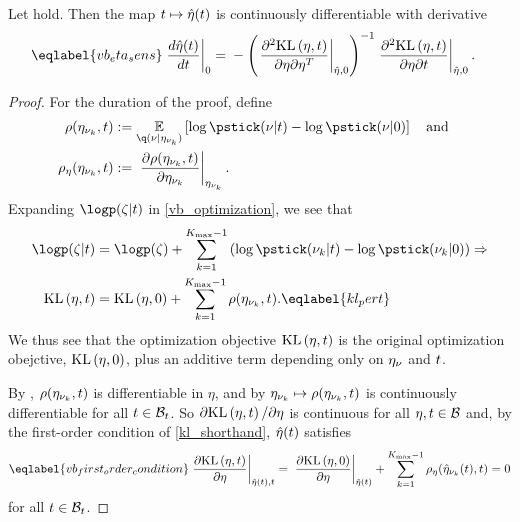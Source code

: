 \begin{thm}
%
Let  hold.  Then the map $t \mapsto
\hat\eta(t)$ is continuously differentiable with derivative
%
\begin{align}\eqlabel{vb_eta_sens}
%
\fracat{d \etaopt(\t)}{d \t}{0} ={}&
    - \left( \fracat{\partial^2 \KL{\eta, \t}}
                    {\partial \eta \partial \eta^T}
                    {\etaopt, 0} \right)^{-1}
    \fracat{\partial^2 \KL{\eta, \t}}
           {\partial \eta \partial \t}
           {\etaopt, 0}.
%
\end{align}
%
%
\begin{proof}
%
For the duration of the proof, define
%
\begin{align*}
%
\rho(\etanuk, \t) :={}&
    \expect{\q(\nu \vert \etanuk)}
           {\log \pstick(\nu \vert \t) - \log \pstick(\nu \vert 0)}
\mathand\\
\rho_\eta(\etanuk, \t) :={}&
\fracat{\partial \rho(\etanuk, \t)}
       {\partial \etanuk}{\etanuk}.
%
\end{align*}
%
Expanding $\logp(\zeta \vert \t)$ in \eqref{vb_optimization}, we see that
%
\begin{align}
%
\logp(\zeta \vert \t) ={}& \logp(\zeta) +
    \sumkm \left( \log \pstick(\nuk\vert\t) -
                  \log \pstick(\nuk \vert 0) \right) \Rightarrow \nonumber\\
\KL{\eta, \t} ={}&
    \KL{\eta, 0} + \sumkm \rho(\etanuk, \t). \eqlabel{kl_pert}
%
\end{align}
%
We thus see that the optimization objective $\mathrm{KL}\left(\eta, t\right)$ is the original
optimization obejctive, $\mathrm{KL}\left(\eta, 0\right)$, plus an additive term depending only on
$\eta_{\nu}$ and $t$.

By , $\rho(\eta_{\nu_{k}}, t)$ is differentiable in $\eta$, and by
 $\eta_{\nu_{k}} \mapsto \rho(\eta_{\nu_{k}}, t)$ is continuously
differentiable for all $t \in \mathcal{B}_t$.  So $\partial \mathrm{KL}\left(\eta, t\right)  /
\partial \eta$ is continuous for all $\eta, t \in \mathcal{B}$ and, by the
first-order condition of \eqref{kl_shorthand}, $\hat\eta(t)$ satisfies
%
\begin{align}\eqlabel{vb_first_order_condition}
%
\fracat{\partial \KL{\eta, \t}}{ \partial \eta}{\etaopt(\t), \t} ={}
\fracat{\partial \KL{\eta, 0}}{ \partial \eta}{\etaopt(\t)}
+  \sumkm \rho_\eta(\etaoptnuk(\t), \t) ={} 0
%
\end{align}
%
for all $t \in \mathcal{B}_t$.


\end{proof}
\end{thm}
